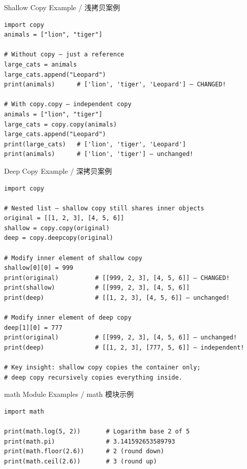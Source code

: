 \documentclass[11pt,a4paper]{report}
\begin{document}
\begin{examplebox}{Shallow Copy Example / 浅拷贝案例}
\begin{lstlisting}
import copy
animals = ["lion", "tiger"]

# Without copy — just a reference
large_cats = animals
large_cats.append("Leopard")
print(animals)      # ['lion', 'tiger', 'Leopard'] — CHANGED!

# With copy.copy — independent copy
animals = ["lion", "tiger"]
large_cats = copy.copy(animals)
large_cats.append("Leopard")
print(large_cats)   # ['lion', 'tiger', 'Leopard']
print(animals)      # ['lion', 'tiger'] — unchanged!
\end{lstlisting}
\end{examplebox}

\begin{examplebox}{Deep Copy Example / 深拷贝案例}
\begin{lstlisting}
import copy

# Nested list — shallow copy still shares inner objects
original = [[1, 2, 3], [4, 5, 6]]
shallow = copy.copy(original)
deep = copy.deepcopy(original)

# Modify inner element of shallow copy
shallow[0][0] = 999
print(original)          # [[999, 2, 3], [4, 5, 6]] — CHANGED!
print(shallow)           # [[999, 2, 3], [4, 5, 6]]
print(deep)              # [[1, 2, 3], [4, 5, 6]] — unchanged!

# Modify inner element of deep copy
deep[1][0] = 777
print(original)          # [[999, 2, 3], [4, 5, 6]] — unchanged!
print(deep)              # [[1, 2, 3], [777, 5, 6]] — independent!

# Key insight: shallow copy copies the container only;
# deep copy recursively copies everything inside.
\end{lstlisting}
\end{examplebox}

\begin{examplebox}{math Module Examples / math 模块示例}
\begin{lstlisting}
import math

print(math.log(5, 2))       # Logarithm base 2 of 5
print(math.pi)              # 3.141592653589793
print(math.floor(2.6))      # 2 (round down)
print(math.ceil(2.6))       # 3 (round up)
\end{lstlisting}
\end{examplebox}
\end{document}
